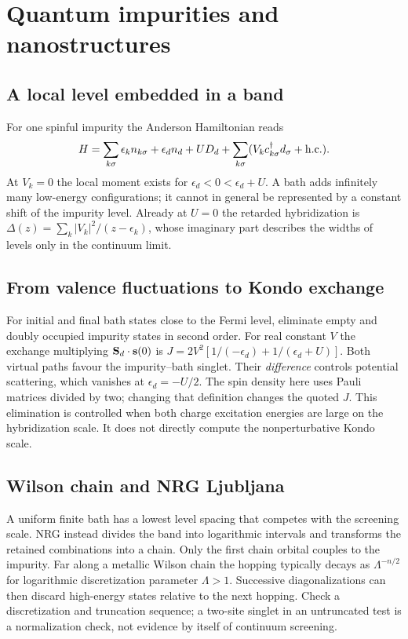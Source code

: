 \chapter{Quantum impurities and nanostructures}
\section{A local level embedded in a band}
For one spinful impurity the Anderson Hamiltonian reads
\[
 H=\sum_{k\sigma}\epsilon_k n_{k\sigma}+\epsilon_d n_d+U D_d+
 \sum_{k\sigma}(V_k c^\dagger_{k\sigma}d_\sigma+\mathrm{h.c.}).
\]
At $V_k=0$ the local moment exists for $\epsilon_d<0<\epsilon_d+U$.
A bath adds infinitely many low-energy configurations; it cannot in
general be represented by a constant shift of the impurity level.
Already at $U=0$ the retarded hybridization is
$\Delta(z)=\sum_k|V_k|^2/(z-\epsilon_k)$, whose imaginary part
describes the widths of levels only in the continuum limit.

\section{From valence fluctuations to Kondo exchange}
For initial and final bath states close to the Fermi level, eliminate
empty and doubly occupied impurity states in second order. For real
constant $V$ the exchange multiplying $\mathbf{S}_d\cdot\mathbf s(0)$ is
$J=2V^2[1/(-\epsilon_d)+1/(\epsilon_d+U)]$. Both virtual paths favour
the impurity--bath singlet. Their \emph{difference} controls potential
scattering, which vanishes at $\epsilon_d=-U/2$. The spin density here
uses Pauli matrices divided by two; changing that definition changes
the quoted $J$. This elimination is controlled when both charge
excitation energies are large on the hybridization scale. It does not
directly compute the nonperturbative Kondo scale.

\section{Wilson chain and NRG Ljubljana}
A uniform finite bath has a lowest level spacing that competes with
the screening scale. NRG instead divides the band into logarithmic
intervals and transforms the retained combinations into a chain.
Only the first chain orbital couples to the impurity. Far along a
metallic Wilson chain the hopping typically decays as
$\Lambda^{-n/2}$ for logarithmic discretization parameter $\Lambda>1$.
Successive diagonalizations can then discard high-energy states relative
to the next hopping. Check a discretization and truncation sequence;
a two-site singlet in an untruncated test is a normalization check,
not evidence by itself of continuum screening.

